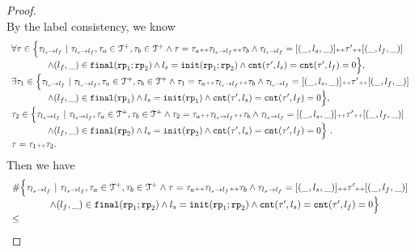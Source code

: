 \begin{proof}
\\
By the label consistency, we know 
\[
  \begin{array}{l}
    \forall \mathtt{\tau} \in
    \Big\{\mathtt{\tau}_{l_s \to l_f} ~\vert~ \mathtt{\tau}_{l_s \to l_f}, \mathtt{\tau}_a \in \mathcal{T}^{+}, \mathtt{\tau}_b \in \mathcal{T}^{+}
    \land \mathtt{\tau} = \mathtt{\tau}_a {\scriptscriptstyle ++} \mathtt{\tau}_{l_s \to l_f} {\scriptscriptstyle ++} \mathtt{\tau}_b
    \land \mathtt{\tau}_{l_s \to l_f} = [(\_, l_s, \_)] {\scriptscriptstyle ++} \mathtt{\tau}' {\scriptscriptstyle ++} [(\_, l_f, \_)]
    \\ \qquad \qquad
    \land (l_{f}, \_) \in \mathtt{final}(\mathtt{rp}_1; \mathtt{rp}_2)
    \land l_s = \mathtt{init}(\mathtt{rp}_1; \mathtt{rp}_2)
    \land \mathtt{cnt}(\mathtt{\tau}', l_s) = \mathtt{cnt}(\mathtt{\tau}', l_f) = 0 
    \Big\},
    \\
    \exists \mathtt{\tau}_1 \in
    \Big\{\mathtt{\tau}_{l_s \to l_f} ~\vert~ \mathtt{\tau}_{l_s \to l_f}, \mathtt{\tau}_a \in \mathcal{T}^{+}, \mathtt{\tau}_b \in \mathcal{T}^{+}
    \land \mathtt{\tau}_1 = \mathtt{\tau}_a {\scriptscriptstyle ++} \mathtt{\tau}_{l_s \to l_f} {\scriptscriptstyle ++} \mathtt{\tau}_b
    \land \mathtt{\tau}_{l_s \to l_f} = [(\_, l_s, \_)] {\scriptscriptstyle ++} \mathtt{\tau}' {\scriptscriptstyle ++} [(\_, l_f, \_)]
    \\ \qquad \qquad
    \land (l_{f}, \_) \in \mathtt{final}(\mathtt{rp}_1)
    \land l_s = \mathtt{init}(\mathtt{rp}_1)
    \land \mathtt{cnt}(\mathtt{\tau}', l_s) = \mathtt{cnt}(\mathtt{\tau}', l_f) = 0 
    \Big\},
    \\
    \mathtt{\tau}_2 \in
    \Big\{\mathtt{\tau}_{l_s \to l_f} ~\vert~ \mathtt{\tau}_{l_s \to l_f}, \mathtt{\tau}_a \in \mathcal{T}^{+}, \mathtt{\tau}_b \in \mathcal{T}^{+}
    \land \mathtt{\tau}_2 = \mathtt{\tau}_a {\scriptscriptstyle ++} \mathtt{\tau}_{l_s \to l_f} {\scriptscriptstyle ++} \mathtt{\tau}_b
    \land \mathtt{\tau}_{l_s \to l_f} = [(\_, l_s, \_)] {\scriptscriptstyle ++} \mathtt{\tau}' {\scriptscriptstyle ++} [(\_, l_f, \_)]
   \\ \qquad \qquad
   \land (l_{f}, \_) \in \mathtt{final}(\mathtt{rp}_2)
   \land l_s = \mathtt{init}(\mathtt{rp}_2)
   \land \mathtt{cnt}(\mathtt{\tau}', l_s) = \mathtt{cnt}(\mathtt{\tau}', l_f) = 0 
   \Big\} 
   ~.~ 
   \\
   \mathtt{\tau} = \mathtt{\tau}_1 {\scriptscriptstyle ++} \mathtt{\tau}_2.
    \end{array}
  \]
  Then we have
  \[
    \begin{array}{l}
      \# \Big\{\mathtt{\tau}_{l_s \to l_f} ~\vert~ \mathtt{\tau}_{l_s \to l_f}, \mathtt{\tau}_a \in \mathcal{T}^{+}, \mathtt{\tau}_b \in \mathcal{T}^{+}
      \land \mathtt{\tau} = \mathtt{\tau}_a {\scriptscriptstyle ++} \mathtt{\tau}_{l_s \to l_f} {\scriptscriptstyle ++} \mathtt{\tau}_b
      \land \mathtt{\tau}_{l_s \to l_f} = [(\_, l_s, \_)] {\scriptscriptstyle ++} \mathtt{\tau}' {\scriptscriptstyle ++} [(\_, l_f, \_)]
      \\ \qquad \qquad
      \land (l_{f}, \_) \in \mathtt{final}(\mathtt{rp}_1; \mathtt{rp}_2)
      \land l_s = \mathtt{init}(\mathtt{rp}_1; \mathtt{rp}_2)
      \land \mathtt{cnt}(\mathtt{\tau}', l_s) = \mathtt{cnt}(\mathtt{\tau}', l_f) = 0 
      \Big\}
      \\ \leq 

\end{array}\]
\end{proof}
